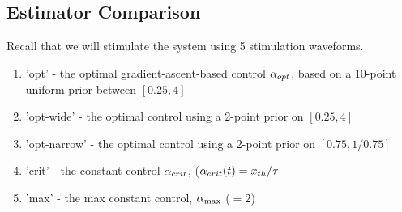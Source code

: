 \documentclass{article}
\begin{document}
% 

% 



\subsection{Estimator Comparison}
Recall that we will stimulate the system using 5 stimulation
waveforms.  
\begin{enumerate}
  \item 'opt' - the optimal gradient-ascent-based  control ${\alpha}_{opt}$, based on
  a 10-point uniform prior between $[0.25, 4]$
  \item  'opt-wide' - the optimal control using a 2-point prior on  $[0.25, 4]$
  \item 'opt-narrow' - the optimal control using a 2-point prior on $[0.75,
  1/0.75]$
\item   'crit' - the constant control
${\alpha}_{crit}$, (${\alpha}_{crit}(t) =  { x_{th} }/{ \tau }$
\item  'max' - the max constant control, ${ {\alpha}_{\textrm{max}} }$ ($=2$)
\end{enumerate} 
\end{document}
